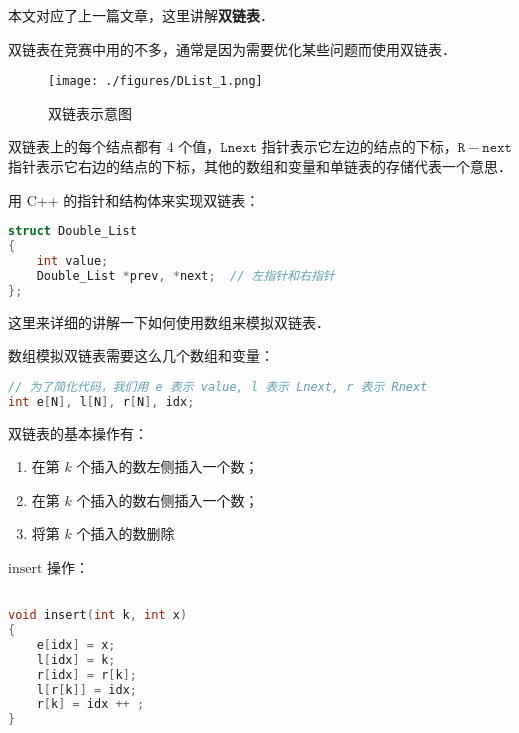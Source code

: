 
本文对应了上一篇文章，这里讲解\textbf{双链表}．

双链表在竞赛中用的不多，通常是因为需要优化某些问题而使用双链表．

\begin{figure}[ht]
\centering
\texttt{[image: ./figures/DList\_1.png]}
\caption{双链表示意图} \label{DList_fig1}
\end{figure}

双链表上的每个结点都有 $4$ 个值，$\mathtt{Lnext}$ 指针表示它左边的结点的下标，$\mathtt{R-next}$ 指针表示它右边的结点的下标，其他的数组和变量和单链表的存储代表一个意思．

用 C++ 的指针和结构体来实现双链表：
\begin{lstlisting}[language=cpp]
struct Double_List
{
    int value;
    Double_List *prev, *next;  // 左指针和右指针
};
\end{lstlisting}

这里来详细的讲解一下如何使用数组来模拟双链表．

数组模拟双链表需要这么几个数组和变量：
\begin{lstlisting}[language=cpp]
// 为了简化代码，我们用 e 表示 value, l 表示 Lnext, r 表示 Rnext
int e[N], l[N], r[N], idx;
\end{lstlisting}

双链表的基本操作有：\begin{enumerate}
\item 在第 $k$ 个插入的数左侧插入一个数；
\item 在第 $k$ 个插入的数右侧插入一个数；
\item 将第 $k$ 个插入的数删除
\end{enumerate}

$\text{insert}$ 操作：

\begin{lstlisting}[language=cpp]

void insert(int k, int x)
{
    e[idx] = x;
    l[idx] = k;
    r[idx] = r[k];
    l[r[k]] = idx;
    r[k] = idx ++ ;
}
\end{lstlisting}

